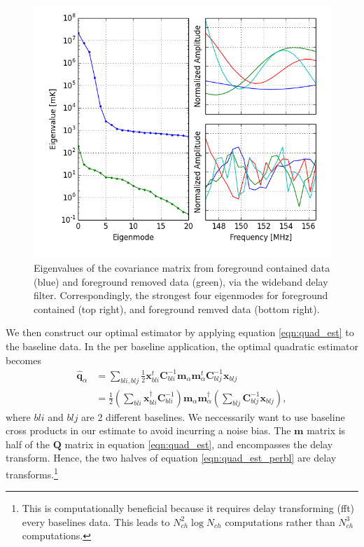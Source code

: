 \documentclass[twocolumn,numberedappendix]{emulateapj} \shorttitle{PSA64}
\newcommand{\x}{\mathbf{x}} \newcommand{\xhat}{\hat{\mathbf{x}}}
\newcommand{\C}{\mathbf{C}} \newcommand{\Q}{\mathbf{Q}}
\begin{document}
\begin{figure}[h!]\centering
\includegraphics[width=\columnwidth, height=\columnwidth]{plots/eig.png}
\caption{Eigenvalues of the covariance matrix from foreground contained data
(blue) and foreground removed data (green), via the wideband delay filter.
Correspondingly, the strongest four eigenmodes for foreground contained (top
right), and foreground remved data (bottom right).}
\label{fig:eigs}
\end{figure}

We then construct our optimal estimator by applying equation \ref{eqn:quad_est}
to the baseline data. In the per baseline application, the optimal quadratic
estimator becomes 
\begin{align}\label{eqn:quad_est_perbl}
    \hat{\mathbf{q}}_{\alpha} &=
\sum_{bli,blj}{\frac{1}{2}\x_{bli}^{t}\C^{-1}_{bli}\mathbf{m}_{\alpha}\mathbf{m}_{\alpha}^{t}\C^{-1}_{blj}\x_{blj}}\\
&=
\frac{1}{2}(\sum_{bli}{\x_{bli}^{\dagger}\C_{bli}^{-1}})\mathbf{m}_{\alpha}\mathbf{m}^{\dagger}_{\alpha}(\sum_{blj}{\C_{blj}^{-1}\x_{blj}}),
\end{align}
where $bli$ and $blj$ are 2 different baselines. We neccessarily want to use
baseline cross products in our estimate to avoid incurring a noise bias. The 
$\mathbf{m}$ matrix is half of the $\Q$ matrix in equation \ref{eqn:quad_est},
and encompasses the delay transform. Hence, the two halves of equation
\ref{eqn:quad_est_perbl} are delay transforms.\footnote{This is computationally
beneficial because it requires delay transforming (fft) every baselines data.
This leads to $N_{ch}^{2}\log{N_{ch}} $ computations rather than $N_{ch}^{3}$
computations.} 
\end{document}
